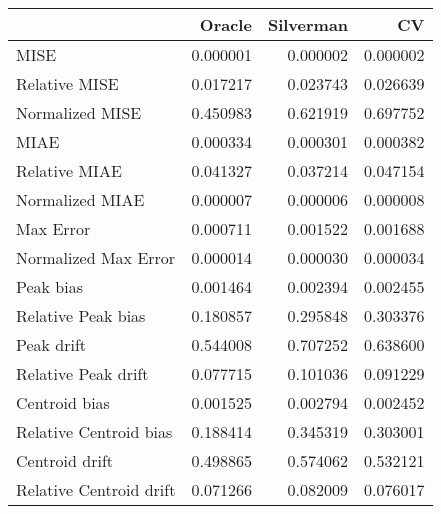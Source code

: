 \begin{tabular}{lrrr}
  \hline
 & Oracle & Silverman & CV \\ 
  \hline
MISE & 0.000001 & 0.000002 & 0.000002 \\ 
  Relative MISE & 0.017217 & 0.023743 & 0.026639 \\ 
  Normalized MISE & 0.450983 & 0.621919 & 0.697752 \\ 
  MIAE & 0.000334 & 0.000301 & 0.000382 \\ 
  Relative MIAE & 0.041327 & 0.037214 & 0.047154 \\ 
  Normalized MIAE & 0.000007 & 0.000006 & 0.000008 \\ 
  Max Error & 0.000711 & 0.001522 & 0.001688 \\ 
  Normalized Max Error & 0.000014 & 0.000030 & 0.000034 \\ 
  Peak bias & 0.001464 & 0.002394 & 0.002455 \\ 
  Relative Peak bias & 0.180857 & 0.295848 & 0.303376 \\ 
  Peak drift & 0.544008 & 0.707252 & 0.638600 \\ 
  Relative Peak drift & 0.077715 & 0.101036 & 0.091229 \\ 
  Centroid bias & 0.001525 & 0.002794 & 0.002452 \\ 
  Relative Centroid bias & 0.188414 & 0.345319 & 0.303001 \\ 
  Centroid drift & 0.498865 & 0.574062 & 0.532121 \\ 
  Relative Centroid drift & 0.071266 & 0.082009 & 0.076017 \\ 
   \hline
\end{tabular}
